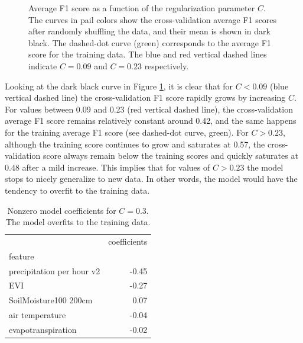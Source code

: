 \documentclass[10pt,parskip=half,
toc=sectionentrywithdots,
bibliography=totocnumbered,
captions=tableheading,numbers=noendperiod]{scrartcl}
\begin{document}
\begin{figure}[H]\begin{center}\end{center}\caption{Average F1 score as a function of the regularization parameter \(C\).
The curves in pail colors show the cross-validation average F1 scores
after randomly shuffling the data, and their mean is shown in dark
black. The dashed-dot curve (green) corresponds to the average F1 score
for the training data. The blue and red vertical dashed lines indicate
\(C=0.09\) and \(C=0.23\) respectively.}\label{fig_cv}\end{figure}

Looking at the dark black curve in Figure \ref{fig_cv}, it is clear that
for \(C<0.09\) (blue vertical dashed line) the cross-validation F1 score
rapidly grows by increasing \(C\). For values between 0.09 and 0.23 (red
vertical dashed line), the cross-validation average F1 score remains
relatively constant around 0.42, and the same happens for the training
average F1 score (see dashed-dot curve, green). For \(C>0.23\), although
the training score continues to grow and saturates at 0.57, the
cross-validation score always remain below the training scores and
quickly saturates at 0.48 after a mild increase. This implies that for
values of \(C>0.23\) the model stops to nicely generalize to new data.
In other words, the model would have the tendency to overfit to the
training data.

\begin{table}[H]
\caption{Nonzero model coefficients for \(C=0.3\). The model overfits to the
training data.}\label{tab_overfit}
\centering
\begin{adjustbox}{max width=\textwidth}
\begin{tabular}{lr}
\toprule
{} &  coefficients \\
feature                   &               \\
\midrule
precipitation per hour v2 &         -0.45 \\
EVI                       &         -0.27 \\
SoilMoisture100 200cm     &          0.07 \\
air temperature           &         -0.04 \\
evapotranspiration        &         -0.02 \\
\bottomrule
\end{tabular}

\end{adjustbox}
\end{table}
\end{document}
